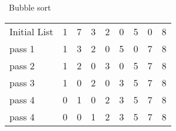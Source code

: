 \documentclass{article}
\begin{document}
                                                                                        \ Bubble sort \\
                                                                                                \begin{tabular}{l*{7}{c}r}
                                                                                                        Initial List & 1 & 7 & 3 & 2 & 0 & 5 & 0  & 8 \\
                                                                                                                pass 1       & 1 & 3 & 2 & 0 & 5 & 0 & 7 & 8 \\
                                                                                                                        pass 2       & 1 & 2 & 0 & 3 & 0 & 5 & 7 & 8 \\
                                                                                                                                pass 3       & 1 & 0 & 2 & 0 & 3 & 5 & 7 & 8 \\
                                                                                                                                        pass 4       & 0 & 1 & 0 & 2 & 3 & 5 & 7 & 8 \\
                                                                                                                                                pass 4       & 0 & 0 & 1 & 2 & 3 & 5 & 7 & 8 \\
                                                                                                                                                        
                                                                                                                                                                \end{tabular}
                                                                                                                                                                        \\
                                                                                                                                                                                \\
                                                                                                                                                                                        
\end{document}
